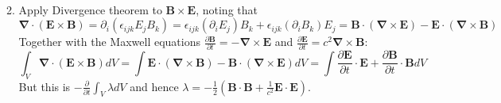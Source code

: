 \documentclass[a4paper]{article}
\begin{document}
\begin{ans}
\begin{enumerate}[label=(\alph*)]
\begin{enumerate}[label=(\roman*)]
\begin{align}
\end{align}
\item Apply Divergence theorem to $\mathbf{B}\times\mathbf{E}$, noting that
$$\boldsymbol{\nabla}\cdot(\mathbf{E}\times\mathbf{B})=\partial_i(\epsilon_{ijk}E_jB_k)=\epsilon_{ijk}(\partial_iE_j)B_k+\epsilon_{ijk}(\partial_iB_k)E_j=\mathbf{B}\cdot(\boldsymbol{\nabla}\times\mathbf{E})-\mathbf{E}\cdot(\boldsymbol{\nabla}\times\mathbf{B})$$
Together with the Maxwell equations $\frac{\partial\mathbf{B}}{\partial t}=-\boldsymbol{\nabla}\times\mathbf{E}$ and $\frac{\partial\mathbf{E}}{\partial t}=c^2\boldsymbol{\nabla}\times\mathbf{B}$:
$$\int_V\boldsymbol{\nabla}\cdot(\mathbf{E}\times\mathbf{B})dV=
\int\mathbf{E}\cdot(\boldsymbol{\nabla}\times\mathbf{B})-\mathbf{B}\cdot(\boldsymbol{\nabla}\times\mathbf{E})dV=\int\frac{\partial\mathbf{E}}{\partial t}\cdot\mathbf{E}+\frac{\partial\mathbf{B}}{\partial t}\cdot\mathbf{B}dV$$
But this is $-\frac{\partial}{\partial t}\int_V\lambda dV$ and hence $\lambda=-\frac{1}{2}(\mathbf{B}\cdot\mathbf{B}+\frac{1}{c^2}\mathbf{E}\cdot\mathbf{E})$.
\end{enumerate}
\end{enumerate}
\end{ans}
\end{document}
